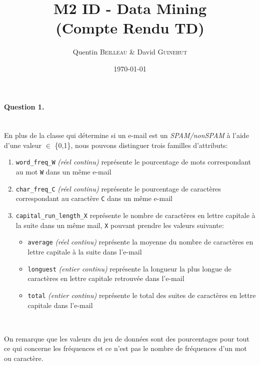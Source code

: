 \documentclass[a4paper,11pt]{article}
\title{M2 ID - Data Mining \\ \normalsize (Compte Rendu TD)}
\author{Quentin \textsc{Beilleau} \& David \textsc{Guinehut}}
\date{\today}
\begin{document}
	\renewcommand{\headrulewidth}{0.001pt}
	
	\pagestyle{fancy}
	
	\maketitle


\paragraph{Question 1.} ~\\

En plus de la classe qui détermine si un e-mail est un \emph{SPAM/nonSPAM} à l'aide d'une valeur $\in$ \{0,1\}, nous pouvons distinguer trois familles d'attributs:

\begin{enumerate}
	\item \texttt{word\_freq\_W} \emph{(réel continu)} représente le pourcentage de mots correspondant au mot \texttt{W} dans un même e-mail
	\item \texttt{char\_freq\_C} \emph{(réel continu)} représente le pourcentage de caractères correspondant au caractère \texttt{C} dans un même e-mail
	\item \texttt{capital\_run\_length\_X} représente le nombre de caractères en lettre capitale à la suite dans un même mail, \texttt{X} pouvant prendre les valeurs suivante:
	\begin{itemize}
		\item \texttt{average} \emph{(réel continu)} représente la moyenne du nombre de caractères en lettre capitale à la suite dans l'e-mail
		\item \texttt{longuest} \emph{(entier continu)} représente la longueur la plus longue de caractères en lettre capitale retrouvée dans l'e-mail
		\item \texttt{total} \emph{(entier continu)} représente le total des suites de caractères en lettre capitale dans l'e-mail
	\end{itemize}
	~
\end{enumerate}

	On remarque que les valeurs du jeu de données sont des pourcentages pour tout ce qui concerne les fréquences et ce n'est pas le nombre de fréquences d'un mot ou caractère.
\end{document}
